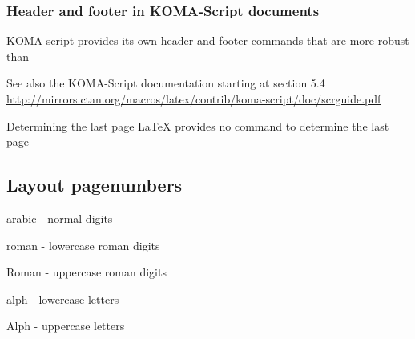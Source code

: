 \begin{frame}
	\frametitle{Header and footer in KOMA-Script documents}

	KOMA script provides its own header and footer commands that are more
	robust than 


	See also the KOMA-Script documentation starting at section 5.4\\
	\url{http://mirrors.ctan.org/macros/latex/contrib/koma-script/doc/scrguide.pdf}

\end{frame}



\begin{frame}
	\begin{block}{Determining the last page}
		{\LaTeX} provides no command to determine the last page
	\end{block}
\end{frame}

\subsection{Layout pagenumbers}
\begin{frame}
	\begin{mitemize}
		\item arabic - normal digits
		\item roman - lowercase roman digits
		\item Roman - uppercase roman digits
		\item alph - lowercase letters
		\item Alph - uppercase letters
	\end{mitemize}
\end{frame}
	
